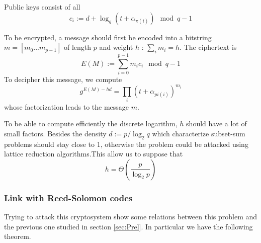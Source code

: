 \documentclass[a4paper]{article}
\begin{document}
Public keys consist of all
$$ c_i := d + \log_g(t + \alpha_{\pi(i)}) \mod q-1 $$

To be encrypted, a message should first be encoded into a bitstring $m = [m_0...m_{p-1}]$ of length $p$ and weight $h$ : $\sum_i m_i = h$. The ciphertext is
$$ E(M) := \sum_{i=0}^{p-1} m_i c_i \mod q-1 $$
To decipher this message, we compute
$$ g^{E(M) - hd} =  \prod_i \left( t + \alpha_{pi(i)}\right)^{m_i} $$
whose factorization leads to the message $m$.

To be able to compute efficiently the discrete logarithm, $h$ should have a lot of small factors. Besides the density $d := p / \log_2 q$ which characterize subset-sum problems should stay close to 1, otherwise the problem could be attacked using lattice reduction algorithms.This allow us to suppose that
$$ h = \Theta\left( \frac{p}{\log_2 p} \right) $$



\subsubsection{Link with Reed-Solomon codes}

Trying to attack this cryptosystem show some relations between this problem and the previous one studied in section \ref{sec:Prel}. In particular we have the following theorem.
\end{document}
